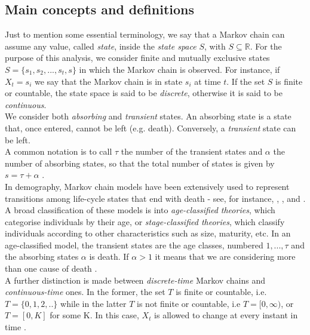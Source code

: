 \subsection{Main concepts and definitions}

Just to mention some essential terminology, we say that a Markov chain can assume any value, called \textit{state}, inside the \textit{state space} $S$, with $S \subseteq \mathds{R}$. For the purpose of this analysis, we consider finite and mutually exclusive states $S = \{s_1,s_2,...,s_t, s\}$ in which the Markov chain is observed. For instance, if $X_t = s_i$ we say that the Markov chain is in state $s_i$ at time $t$.
If the set $S$ is finite or countable, the state space is said to be \textit{discrete}, otherwise it is said to be \textit{continuous}.\\
We consider both \textit{absorbing} and \textit{transient} states. An absorbing state is a state that, once entered, cannot be left (e.g. death). Conversely, a \textit{transient} state can be left.\\ A common notation is to call $\tau$ the number of the transient states and $\alpha$ the number of absorbing states, so that the total number of states is given by $s = \tau + \alpha$ \citep{VanDaalen2017}.\\


In demography, Markov chain models have been extensively used to represent transitions among life-cycle states that end with death - see, for instance, \cite{Caswell2001, Caswell2006, Caswell2009}, \cite{Fujiwara2002}, and \cite{Cochran1992}. A broad classification of these models is into \textit{age-classified theories}, which categorise individuals by their age, or \textit{stage-classified
theories}, which classify individuals according to other characteristics such as size, maturity, etc. In an age-classified model, the transient states are the age classes, numbered $1,..., \tau$ and the absorbing states $\alpha$ is death. If $\alpha >1$ it means that we are considering more than one cause of death \citep{Caswell2018}. \\

A further distinction is made between \textit{discrete-time} Markov chains and \textit{continuous-time} ones. In the former, the set $T$ is finite or countable, i.e. $T = \{ 0,1,2,..\}$ while in the latter $T$ is not finite or countable, i.e $T = [0,\infty)$, or $T = [0,K]$ for some K. In this case, $X_t$ is allowed to change at every instant in time \citep{Holmes2015}.



